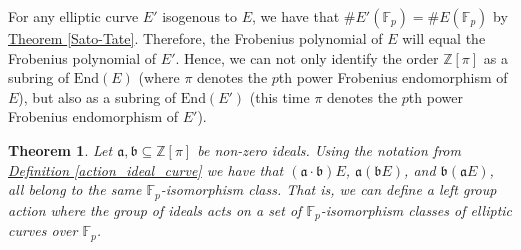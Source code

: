 \documentclass[openany, a4paper, 10pt]{book}
\theoremstyle{plain}
\newtheorem{theorem}{Theorem}[chapter]
\theoremstyle{plain}
\theoremstyle{plain}
\theoremstyle{definition}
\theoremstyle{plain}
\theoremstyle{definition}
\theoremstyle{remark}
\newcommand{\defref}[1]{\hyperref[#1]{Definition \ref{#1}}}
\newcommand{\theoref}[1]{\hyperref[#1]{Theorem \ref{#1}}}
\begin{document}
For any elliptic curve $E'$ isogenous to $E$, we have that $\#E'(\mathbb F_p) = \#E(\mathbb F_p)$ by \theoref{Sato-Tate}.
Therefore, the Frobenius polynomial of $E$ will equal the Frobenius polynomial of $E'$.
Hence, we can not only identify the order $\mathbb Z[\pi]$ as a subring of $\mathrm{End}(E)$ (where $\pi$ denotes the $p$th power Frobenius endomorphism of $E$), but also as a subring of $\mathrm{End}(E')$ (this time $\pi$ denotes the $p$th power Frobenius endomorphism of $E'$).


\begin{theorem}\label{it_commutes}
    Let $\mathfrak a, \mathfrak b \subseteq \mathbb Z[\pi]$ be non-zero ideals.
    Using the notation from \defref{action_ideal_curve} we have that $(\mathfrak a \cdot \mathfrak b)E$, $\mathfrak a (\mathfrak bE)$, and $\mathfrak b (\mathfrak aE)$, all belong to the same $\mathbb F_p$-isomorphism class.
    That is, we can define a left group action where the group of ideals acts on a set of $\mathbb F_p$-isomorphism classes of elliptic curves over $\mathbb F_p$.
\end{theorem}
\end{document}
